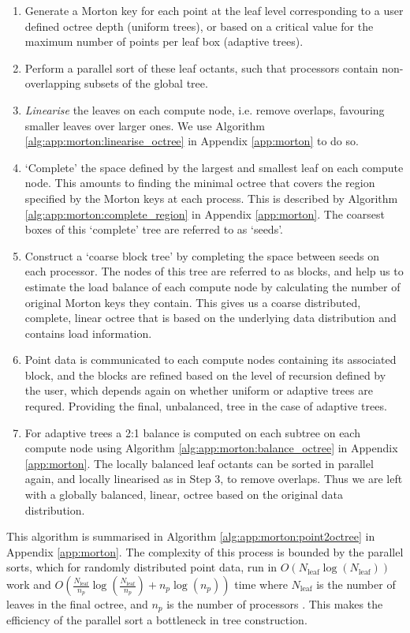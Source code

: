 \begin{enumerate}
    \item Generate a Morton key for each point at the leaf level corresponding to a user defined octree depth (uniform trees), or based on a critical value for the maximum number of points per leaf box (adaptive trees).
    \item Perform a parallel sort of these leaf octants, such that processors contain non-overlapping subsets of the global tree.
    \item \textit{Linearise} the leaves on each compute node, i.e. remove overlaps, favouring smaller leaves over larger ones. We use Algorithm \ref{alg:app:morton:linearise_octree} in Appendix \ref{app:morton} to do so.
    \item `Complete' the space defined by the largest and smallest leaf on each compute node. This amounts to finding the minimal octree that covers the region specified by the Morton keys at each process. This is described by Algorithm \ref{alg:app:morton:complete_region} in Appendix \ref{app:morton}. The coarsest boxes of this `complete' tree are referred to as `seeds'.
    \item Construct a `coarse block tree' by completing the space between seeds on each processor. The nodes of this tree are referred to as blocks, and help us to estimate the load balance of each compute node by calculating the number of original Morton keys they contain. This gives us a coarse distributed, complete, linear octree that is based on the underlying data distribution and contains load information.
    \item Point data is communicated to each compute nodes containing its associated block, and the blocks are refined based on the level of recursion defined by the user, which depends again on whether uniform or adaptive trees are requred. Providing the final, unbalanced, tree in the case of adaptive trees.
    \item For adaptive trees a 2:1 balance is computed on each subtree on each compute node using Algorithm \ref{alg:app:morton:balance_octree} in Appendix \ref{app:morton}. The locally balanced leaf octants can be sorted in parallel again, and locally linearised as in Step 3, to remove overlaps. Thus we are left with a globally balanced, linear, octree based on the original data distribution.
\end{enumerate}

This algorithm is summarised in Algorithm \ref{alg:app:morton:point2octree} in Appendix \ref{app:morton}. The complexity of this process is bounded by the parallel sorts, which for randomly distributed point data, run in $O(N_{\text{leaf}} \log (N_{\text{leaf}}))$ work and $O(\frac{N_{\text{leaf}}}{n_p} \log(\frac{N_{\text{leaf}}}{n_p}) + n_p \log (n_p))$ time where $N_{\text{leaf}}$ is the number of leaves in the final octree, and $n_p$ is the number of processors \cite{sundar2013hyksort}. This makes the efficiency of the parallel sort a bottleneck in tree construction.

